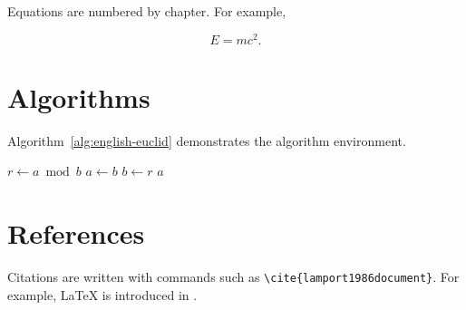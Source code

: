 Equations are numbered by chapter. For example,

\begin{equation}
    E = mc^2 .
\end{equation}

\section{Algorithms}

Algorithm~\ref{alg:english-euclid} demonstrates the algorithm environment.

\begin{algorithm}[!htbp]
    \small
    \caption{Euclid's algorithm}\label{alg:english-euclid}
    \begin{algorithmic}[1]
            \State $r \gets a \bmod b$
            \State $a \gets b$
            \State $b \gets r$
        \EndWhile
        \State \Return $a$
        \EndProcedure
    \end{algorithmic}
\end{algorithm}

\section{References}

Citations are written with commands such as \verb|\cite{lamport1986document}|. For example, \LaTeX{} is introduced in \cite{lamport1986document}.
